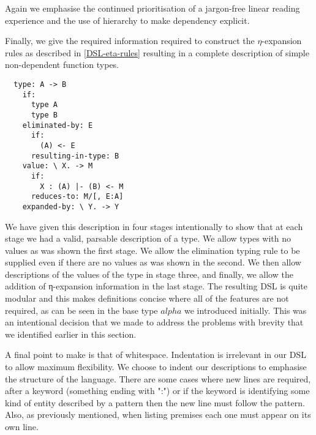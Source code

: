 Again we emphasise the continued prioritisation of a jargon-free linear
reading experience and the use of hierarchy to make dependency explicit.

Finally, we give the required information required to construct the
$\eta$-expansion rules as described in \ref{DSL-eta-rules} resulting in
a complete description of simple non-dependent function types.

\begin{BVerbatim}
  type: A -> B
    if:
      type A
      type B
    eliminated-by: E
      if:
        (A) <- E
      resulting-in-type: B
    value: \ X. -> M
      if:
        X : (A) |- (B) <- M
      reduces-to: M/[, E:A]
    expanded-by: \ Y. -> Y
\end{BVerbatim}

We have given this description in four stages intentionally to show
that at each stage we had a valid, parsable description of a type. We
allow types with no values as was shown the first stage. We
allow the elimination typing rule to be supplied even if there are no
values as was shown in the second. We then allow descriptions of
the values of the type in stage three, and finally, we allow the
addition of η-expansion information in the last stage. The
resulting DSL is quite modular and this makes definitions
concise where all of the features are not required, as can be seen in
the base type $alpha$ we introduced initially. This was an intentional
decision that we made to address the problems with brevity that we
identified earlier in this section.

A final point to make is that of whitespace. Indentation is irrelevant
in our DSL to allow maximum flexibility. We choose to indent
our descriptions to emphasise the structure of the
language. There are some cases where new lines are required, after a
keyword (something ending with ":") or if the keyword is identifying
some kind of entity described by a pattern then the new line must
follow the pattern. Also, as previously mentioned, when listing
premises each one must appear on its own line.
